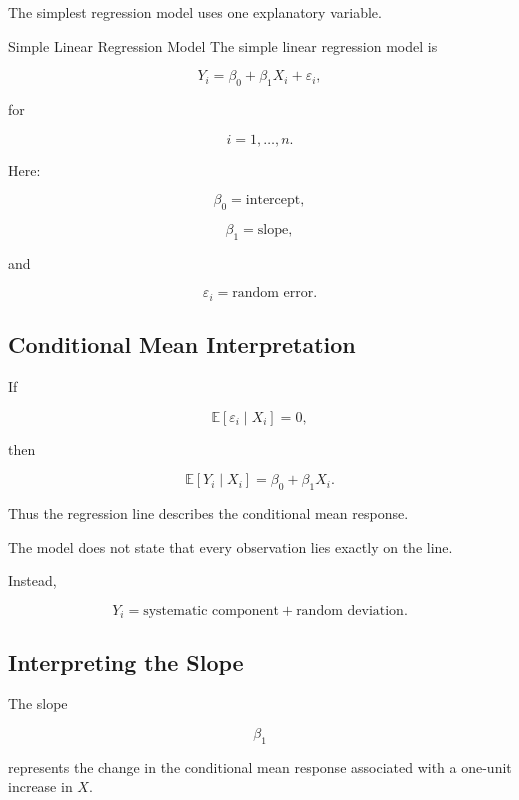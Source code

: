 The simplest regression model uses one explanatory variable.

\begin{definitionbox}{Simple Linear Regression Model}
The simple linear regression model is

\[
\boxed{
Y_i
=
\beta_0
+
\beta_1X_i
+
\varepsilon_i,
}
\]

for

\[
i=1,\ldots,n.
\]
\end{definitionbox}

Here:

\[
\boxed{
\beta_0
=
\text{intercept},
}
\]

\[
\boxed{
\beta_1
=
\text{slope},
}
\]

and

\[
\boxed{
\varepsilon_i
=
\text{random error}.
}
\]

\subsection{Conditional Mean Interpretation}
\label{subsec:conditional-mean-regression}

If

\[
\mathbb{E}[\varepsilon_i\mid X_i]=0,
\]

then

\[
\boxed{
\mathbb{E}[Y_i\mid X_i]
=
\beta_0+\beta_1X_i.
}
\]

Thus the regression line describes the conditional mean response.

The model does not state that every observation lies exactly on the line.

Instead,

\[
\boxed{
Y_i
=
\text{systematic component}
+
\text{random deviation}.
}
\]

\subsection{Interpreting the Slope}
\label{subsec:interpreting-regression-slope}

The slope

\[
\beta_1
\]

represents the change in the conditional mean response associated with a
one-unit increase in \(X\).


